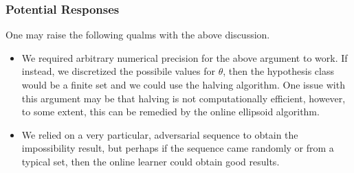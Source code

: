 \documentclass{article}
\begin{document}
\subsubsection{Potential Responses}
One may raise the following qualms with the above discussion.
\begin{itemize}
    \item We required arbitrary numerical precision for the above argument to work. If instead, we discretized the possibile values for $\theta$, then the hypothesis class would be a finite set and we could use the halving algorithm. One issue with this argument may be that halving is not computationally efficient, however, to some extent, this can be remedied by the online ellipsoid algorithm.
    \item We relied on a very particular, adversarial sequence to obtain the impossibility result, but perhaps if the sequence came randomly or from a typical set, then the online learner could obtain good results.
\end{itemize}
\end{document}
